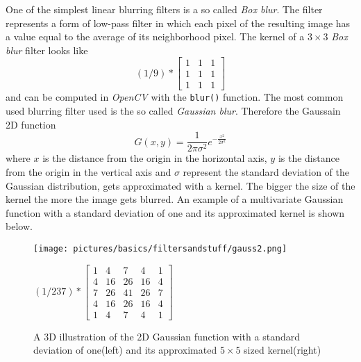 One of the simplest linear blurring filters is a so called \textit{Box blur}. The filter represents a form of low-pass filter in which each pixel of the resulting image has a value equal to the average of its neighborhood pixel. The kernel of a $3\times3$ \textit{Box blur} filter looks like
\begin{equation}
(1/9)*
\begin{bmatrix}
  1 & 1 & 1 \\ 
  1 & 1 & 1 \\
  1 & 1 & 1
\end{bmatrix}
\end{equation}
and can be computed in \textit{OpenCV} with the \lstinline|blur()| function.
The most common used blurring filter used is the so called \textit{Gaussian blur}. Therefore the Gaussain 2D function 
\begin{equation}
G(x,y) = \frac{1}{2\pi\sigma^2}e^{-\frac{x^2}{2\sigma^2}}
\end{equation}
where $x$ is the distance from the origin in the horizontal axis, $y$ is the distance from the origin in the vertical axis and $\sigma$ represent the standard deviation of the Gaussian distribution, gets approximated with a kernel. The bigger the size of the kernel the more the image gets blurred. An example of a multivariate Gaussian function with a standard deviation of one and its approximated kernel is shown below. 
\begin{figure}[h]
\centering
\begin{minipage}[h]{0.5\textwidth}
\texttt{[image: pictures/basics/filtersandstuff/gauss2.png]}
\end{minipage}%
\begin{minipage}[h]{0.5\textwidth}
$(1/237)*
\begin{bmatrix}
 1 & 4 & 7 & 4 & 1 \\
  4 & 16 & 26 & 16 & 4 \\
   7 & 26 & 41 & 26 & 7 \\
    4 & 16 & 26 & 16 & 4 \\
     1 & 4 & 7 & 4 & 1      
\end{bmatrix}
$
\end{minipage}
\caption{A 3D illustration of the 2D Gaussian function with a standard deviation of one(left) and its approximated $5\times5$ sized kernel(right)}
\end{figure}

\newpage

